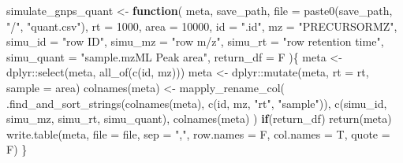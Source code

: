 \documentclass[
]{article}
\newenvironment{Shaded}{\begin{snugshade}}{\end{snugshade}}
\newcommand{\AttributeTok}[1]{\textcolor[rgb]{0.77,0.63,0.00}{#1}}
\newcommand{\ControlFlowTok}[1]{\textcolor[rgb]{0.13,0.29,0.53}{\textbf{#1}}}
\newcommand{\DecValTok}[1]{\textcolor[rgb]{0.00,0.00,0.81}{#1}}
\newcommand{\FunctionTok}[1]{\textcolor[rgb]{0.00,0.00,0.00}{#1}}
\newcommand{\NormalTok}[1]{#1}
\newcommand{\OtherTok}[1]{\textcolor[rgb]{0.56,0.35,0.01}{#1}}
\newcommand{\SpecialCharTok}[1]{\textcolor[rgb]{0.00,0.00,0.00}{#1}}
\newcommand{\StringTok}[1]{\textcolor[rgb]{0.31,0.60,0.02}{#1}}
\begin{document}
\begin{Shaded}
\begin{Highlighting}[]
\NormalTok{simulate\_gnps\_quant }\OtherTok{\textless{}{-}} 
  \ControlFlowTok{function}\NormalTok{(}
\NormalTok{           meta,}
\NormalTok{           save\_path,}
           \AttributeTok{file =} \FunctionTok{paste0}\NormalTok{(save\_path, }\StringTok{"/"}\NormalTok{, }\StringTok{"quant.csv"}\NormalTok{),}
           \AttributeTok{rt =} \DecValTok{1000}\NormalTok{,}
           \AttributeTok{area =} \DecValTok{10000}\NormalTok{,}
           \AttributeTok{id =} \StringTok{".id"}\NormalTok{,}
           \AttributeTok{mz =} \StringTok{"PRECURSORMZ"}\NormalTok{,}
           \AttributeTok{simu\_id =} \StringTok{"row ID"}\NormalTok{,}
           \AttributeTok{simu\_mz =} \StringTok{"row m/z"}\NormalTok{,}
           \AttributeTok{simu\_rt =} \StringTok{"row retention time"}\NormalTok{,}
           \AttributeTok{simu\_quant =} \StringTok{"sample.mzML Peak area"}\NormalTok{,}
           \AttributeTok{return\_df =}\NormalTok{ F}
\NormalTok{           )\{}
\NormalTok{    meta }\OtherTok{\textless{}{-}}\NormalTok{ dplyr}\SpecialCharTok{::}\FunctionTok{select}\NormalTok{(meta, }\FunctionTok{all\_of}\NormalTok{(}\FunctionTok{c}\NormalTok{(id, mz)))}
\NormalTok{    meta }\OtherTok{\textless{}{-}}\NormalTok{ dplyr}\SpecialCharTok{::}\FunctionTok{mutate}\NormalTok{(meta, }\AttributeTok{rt =}\NormalTok{ rt, }\AttributeTok{sample =}\NormalTok{ area)}
    \FunctionTok{colnames}\NormalTok{(meta) }\OtherTok{\textless{}{-}} 
      \FunctionTok{mapply\_rename\_col}\NormalTok{(}
        \FunctionTok{.find\_and\_sort\_strings}\NormalTok{(}\FunctionTok{colnames}\NormalTok{(meta), }\FunctionTok{c}\NormalTok{(id, mz, }\StringTok{"rt"}\NormalTok{, }\StringTok{"sample"}\NormalTok{)),}
        \FunctionTok{c}\NormalTok{(simu\_id, simu\_mz, simu\_rt, simu\_quant),}
        \FunctionTok{colnames}\NormalTok{(meta)}
\NormalTok{      )}
    \ControlFlowTok{if}\NormalTok{(return\_df)}
      \FunctionTok{return}\NormalTok{(meta)}
    \FunctionTok{write.table}\NormalTok{(meta, }\AttributeTok{file =}\NormalTok{ file, }\AttributeTok{sep =} \StringTok{","}\NormalTok{, }\AttributeTok{row.names =}\NormalTok{ F, }\AttributeTok{col.names =}\NormalTok{ T, }\AttributeTok{quote =}\NormalTok{ F)}
\NormalTok{  \}}
\end{Highlighting}
\end{Shaded}
\end{document}
